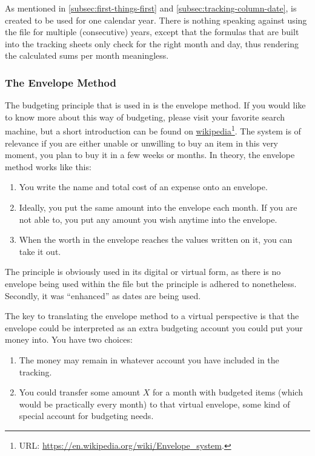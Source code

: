 As mentioned in \autoref{subsec:first-things-first} and \autoref{subsec:tracking-column-date}, \tfn is created to be used for one calendar year.
There is nothing speaking against using the file for multiple (consecutive) years, except that the formulas that are built into the tracking sheets only check for the right month and day, thus rendering the calculated sums per month meaningless.

\subsubsection{The Envelope Method}
\label{subsubsec:budgeting-the-envelope-method}

The budgeting principle that is used in \tfn is the envelope method.
If you would like to know more about this way of budgeting, please visit your favorite search machine, but a short introduction can be found on \href{https://en.wikipedia.org/wiki/Envelope_system}{wikipedia}\footnote{URL: \href{https://en.wikipedia.org/wiki/Envelope_system}{https://en.wikipedia.org/wiki/Envelope{\_}system}.}.
The system is of relevance if you are either unable or unwilling to buy an item in this very moment, \ie you plan to buy it in a few weeks or months.
In theory, the envelope method works like this:
\begin{enumerate}
	\item You write the name and total cost of an expense onto an envelope.
	\item Ideally, you put the same amount into the envelope each month.
	If you are not able to, you put any amount you wish anytime into the envelope.
	\item When the worth in the envelope reaches the values written on it, you can take it out.
\end{enumerate}

The principle is obviously used in its digital or virtual form, as there is no envelope being used within the file but the principle is adhered to nonetheless.
Secondly, it was ``enhanced'' as dates are being used.

The key to translating the envelope method to a virtual perspective is that the envelope could be interpreted as an extra budgeting account you could put your money into.
You have two choices:
\begin{enumerate}
	\item The money may remain in whatever account you have included in the tracking.
	\item You could transfer some amount \( X \) for a month with budgeted items (which would be practically every month) to that virtual envelope, \ie some kind of special account for budgeting needs.
\end{enumerate}

